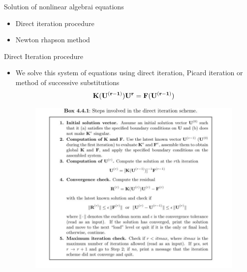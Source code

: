	\begin{frame}{Solution of nonlinear algebrai equations	}
		\begin{itemize}
			\item Direct iteration procedure
			\item Newton rhapson method
		\end{itemize}
	\end{frame}


	\begin{frame}{Direct Iteration procedure}
		\begin{itemize}
			\item We solve this system of equations using direct iteration, Picard iteration or method of successive substitutions
			\begin{equation}
				\mathbf{K(U^{(r-1)})U^r = F(U^{(r-1)})}
			\end{equation}
			\begin{figure}
				\centering
				\includegraphics[width=0.8\linewidth]{Figure/fig13} 
			\end{figure}
		\end{itemize}
	\end{frame}


